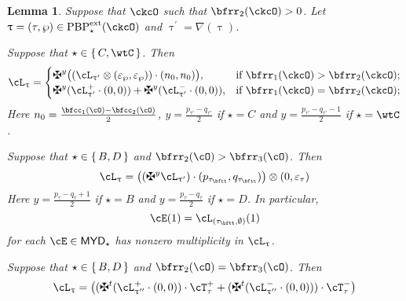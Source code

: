 \documentclass[12pt,a4paper]{amsart}
\def\MYD{{\mathsf{MYD}}}
\def\DD{\nabla}
\numberwithin{equation}{section}
\newtheorem{lem}[thm]{Lemma}
\theoremstyle{remark}
\def\PBPes{\mathrm{PBP}^{\mathrm{ext}}_{\star}}
\def\uptaup{\uptau^{\prime}}
\def\uptaupp{\uptau^{\prime\prime}}
\begin{document}
\begin{lem}\label{lem:dlift}
  Suppose that $\ckcO$ such that $\bfrr_{2}(\ckcO)>0$. Let
  $\uptau = (\tau,\wp)\in \PBPes(\ckcO)$ and $\uptaup = \DD(\uptau)$.
\begin{enuma}
  \item
  Suppose that $\star\in \set{C,\wtC}$.  Then
  \begin{equation}\label{eq:C}
    \ac_{\uptau}=
    \begin{cases}
      \maltese^{y}\big( (\ac_{\uptau'}\lotimes (\varepsilon_{\wp},\varepsilon_{\wp}))
      \cdot (n_{0},n_{0})\big), & \text{if } \bfrr_{1}(\ckcO)>\bfrr_{2}(\ckcO);\\
      \maltese^{y} (\pac{\uptau'} \cdot (0,0)) + \maltese^y(\nac{\uptaup}\cdot (0,0)),
      & \text{if } \bfrr_{1}(\ckcO)=\bfrr_{2}(\ckcO);
    \end{cases}
  \end{equation}
  Here %
    $n_{0} = \frac{\bfcc_{1}(\cO)-\bfcc_{2}(\cO)}{2}$,
    $y = \frac{p_{\tau'}-q_{\tau'}}{2}$ if $\star=C$ and
    $y = \frac{p_{\tau'}-q_{\tau'}-1}{2}$ if $\star=\wtC$.
  \item
  Suppose that $\star\in \set{B,D}$ and $\bfrr_{2}(\cO)>\bfrr_{3}(\cO)$. Then
  \begin{equation}\label{eq:BD}
    \ac_{\uptau}= \big((\maltese^{y}\ac_{\uptau'})\cdot (p_{\tau_{\bftt}},q_{\tau_{\bftt}})\big)
    \lotimes (0,\varepsilon_{\tau})
  \end{equation}
  Here %
    $y = \frac{p_{\tau}-q_{\tau}+1}{2}$ if $\star=B$ and
    $y = \frac{p_{\tau}-q_{\tau}}{2}$ if $\star=D$.
  In particular,
  \begin{equation}\label{eq:TBD}
    \cE(1) = \ac_{(\tau_{\bftt},\emptyset)}(1)
  \end{equation}
  for each $\cE\in \MYD_\star$ has nonzero multiplicity in $\ac_{\uptau}$.
  \item
  Suppose that $\star\in \set{B,D}$ and $\bfrr_{2}(\cO)=\bfrr_{3}(\cO)$.
  Then
  \begin{equation}\label{eq:BD2}
    \ac_{\uptau} =
    \big((\maltese^t (\pac{\uptaupp}\cdot (0,0)) \cdot \pcT_{\tau}
    +  (\maltese^t(\nac{\uptaupp}\cdot (0,0)) ) \cdot \ncT_{\tau}\big)

\end{equation}
\end{enuma}
\end{lem}
\end{document}
